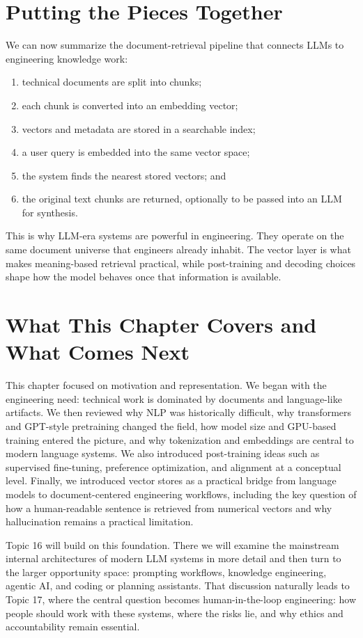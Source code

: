 \documentclass[12pt]{article}
\begin{document}
\section{Putting the Pieces Together}

We can now summarize the document-retrieval pipeline that connects LLMs to engineering knowledge work:

\begin{enumerate}
    \item technical documents are split into chunks;
    \item each chunk is converted into an embedding vector;
    \item vectors and metadata are stored in a searchable index;
    \item a user query is embedded into the same vector space;
    \item the system finds the nearest stored vectors; and
    \item the original text chunks are returned, optionally to be passed into an LLM for synthesis.
\end{enumerate}

This is why LLM-era systems are powerful in engineering. They operate on the same document universe that engineers already inhabit. The vector layer is what makes meaning-based retrieval practical, while post-training and decoding choices shape how the model behaves once that information is available.

\section{What This Chapter Covers and What Comes Next}

This chapter focused on motivation and representation. We began with the engineering need: technical work is dominated by documents and language-like artifacts. We then reviewed why NLP was historically difficult, why transformers and GPT-style pretraining changed the field, how model size and GPU-based training entered the picture, and why tokenization and embeddings are central to modern language systems. We also introduced post-training ideas such as supervised fine-tuning, preference optimization, and alignment at a conceptual level. Finally, we introduced vector stores as a practical bridge from language models to document-centered engineering workflows, including the key question of how a human-readable sentence is retrieved from numerical vectors and why hallucination remains a practical limitation.

Topic 16 will build on this foundation. There we will examine the mainstream internal architectures of modern LLM systems in more detail and then turn to the larger opportunity space: prompting workflows, knowledge engineering, agentic AI, and coding or planning assistants. That discussion naturally leads to Topic 17, where the central question becomes human-in-the-loop engineering: how people should work with these systems, where the risks lie, and why ethics and accountability remain essential.
\end{document}
